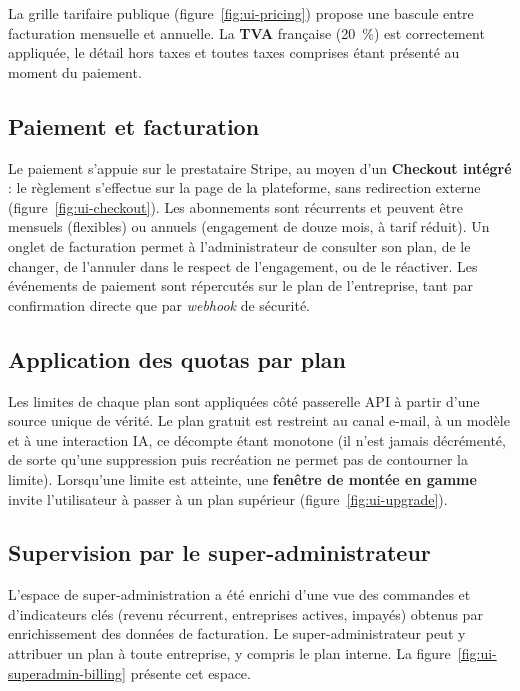 La grille tarifaire publique (figure~\ref{fig:ui-pricing}) propose une
bascule entre facturation mensuelle et annuelle. La \textbf{TVA} française
(20~\%) est correctement appliquée, le détail hors taxes et toutes taxes
comprises étant présenté au moment du paiement.


\subsection{Paiement et facturation}
Le paiement s'appuie sur le prestataire Stripe, au moyen d'un
\textbf{Checkout intégré} : le règlement s'effectue sur la page de la
plateforme, sans redirection externe (figure~\ref{fig:ui-checkout}). Les
abonnements sont récurrents et peuvent être mensuels (flexibles) ou annuels
(engagement de douze mois, à tarif réduit). Un onglet de facturation permet à
l'administrateur de consulter son plan, de le changer, de l'annuler dans le
respect de l'engagement, ou de le réactiver. Les événements de paiement sont
répercutés sur le plan de l'entreprise, tant par confirmation directe que par
\emph{webhook} de sécurité.


\subsection{Application des quotas par plan}
Les limites de chaque plan sont appliquées côté passerelle API à partir
d'une source unique de vérité. Le plan gratuit est restreint au canal
e-mail, à un modèle et à une interaction IA, ce décompte étant monotone (il
n'est jamais décrémenté, de sorte qu'une suppression puis recréation ne
permet pas de contourner la limite). Lorsqu'une limite est atteinte, une
\textbf{fenêtre de montée en gamme} invite l'utilisateur à passer à un plan
supérieur (figure~\ref{fig:ui-upgrade}).


\subsection{Supervision par le super-administrateur}
L'espace de super-administration a été enrichi d'une vue des commandes et
d'indicateurs clés (revenu récurrent, entreprises actives, impayés) obtenus
par enrichissement des données de facturation. Le super-administrateur peut y
attribuer un plan à toute entreprise, y compris le plan interne. La
figure~\ref{fig:ui-superadmin-billing} présente cet espace.

